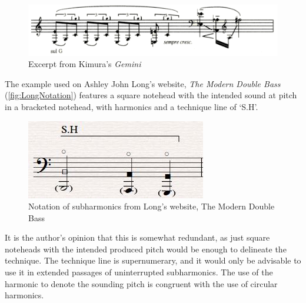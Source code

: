  
\begin{figure}
  \includegraphics[width=\linewidth]{./resources/kimura_gemini.png}
  \caption{Excerpt from Kimura's \emph{Gemini}}\label{fig:Excerpt from Kimura's Gemini}
\end{figure}

The example used on Ashley John Long's website, \emph{The Modern Double Bass} (\autoref{fig:LongNotation}) features a square notehead with the intended sound at pitch in a bracketed notehead, with harmonics and a technique line of `S.H'.\autocite[]{longSubharmonics2019}

\begin{figure}
  \includegraphics{./resources/longSubharmonicNotation.jpg}
  \caption{Notation of subharmonics from Long's website, The Modern Double Bass}\label{fig:LongNotation}
\end{figure}

It is the author's opinion that this is somewhat redundant, as just square noteheads with the intended produced pitch would be enough to delineate the technique. 
The technique line is supernumerary, and it would only be advisable to use it in extended passages of uninterrupted subharmonics.
The use of the harmonic to denote the sounding pitch is congruent with the use of circular harmonics.


